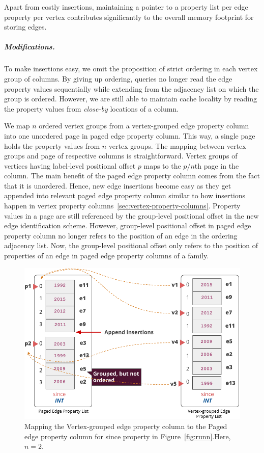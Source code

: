 Apart from costly insertions, maintaining a pointer to a property list per edge property per vertex contributes significantly to the overall memory footprint for storing edges.

\vspace{-16pt}
\subparagraph{Modifications.}To make insertions easy, we omit the proposition of strict ordering in each vertex group of columns. By giving up ordering, queries no longer read the edge property values sequentially while extending from the adjacency list on which the group is ordered. However, we are still able to maintain cache locality by reading the property values from \emph{close-by} locations of a column.

We map $n$ ordered vertex groups from a vertex-grouped edge property column into one unordered page in paged edge property column. This way, a single page holds the property values from $n$ vertex groups. The mapping between vertex groups and page of respective columns is straightforward. Vertex groups of vertices having label-level positional offset $p$ maps to the $p/n$th page in the column. The main benefit of the paged edge property column comes from the fact that it is unordered. Hence, new edge insertions become easy as they get appended into relevant paged edge property column similar to how insertions happen in vertex property columns~\ref{sec:vertex-property-columns}. Property values in a page are still referenced by the group-level positional offset in the new edge identification scheme. However, group-level positional offset in paged edge property column no longer refers to the position of an edge in the ordering adjacency list. Now, the group-level positional offset only refers to the position of properties of an edge in paged edge property columns of a family. 

\begin{figure}
	\vspace{-40pt}
	\hfill\includegraphics[scale=0.78]{img/paged}\hspace*{\fill}
	\captionsetup{justification=centering}
	\caption{Mapping the Vertex-grouped edge property column to the Paged edge property column for since property in Figure~\ref{fig:runn}.Here, $n=2$.}
	\label{fig:paged}
	\vspace{-5pt}
\end{figure}

